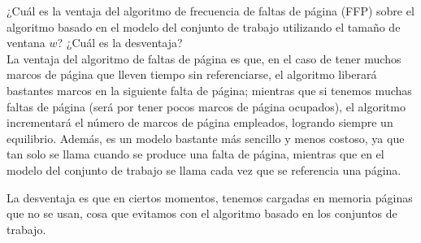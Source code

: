 \begin{ejercicio}
    ¿Cuál es la ventaja del algoritmo de frecuencia de faltas de página (FFP) sobre el algoritmo basado en el
modelo del conjunto de trabajo utilizando el tamaño de ventana $w$? ¿Cuál es la
desventaja?\\

    La ventaja del algoritmo de faltas de página es que, en el caso de tener muchos marcos de página que lleven tiempo sin referenciarse,
    el algoritmo liberará bastantes marcos en la siguiente falta de página; mientras que si tenemos muchas faltas de página (será por tener pocos
    marcos de página ocupados),
    el algoritmo incrementará el número de marcos de página empleados, logrando siempre un equilibrio.
    Además, es un modelo bastante más sencillo y menos costoso,
    ya que tan solo se llama cuando se produce una falta de página, mientras que en el
    modelo del conjunto de trabajo se llama cada vez que se referencia una página.


    La desventaja es que en ciertos momentos, tenemos cargadas en memoria páginas que no se usan,
    cosa que evitamos con el algoritmo basado en los conjuntos de trabajo.
\end{ejercicio}



